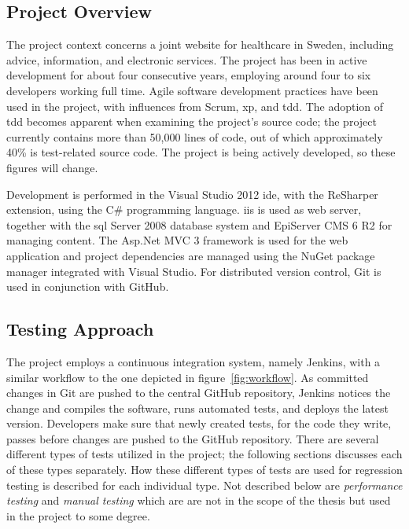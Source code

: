 \documentclass[a4paper,english,12pt]{report}
\begin{document}
\subsection{Project Overview}
The project context concerns a joint website for healthcare in Sweden, including advice, information, and electronic services. The project has been in active development for about four consecutive years, employing around four to six developers working full time. Agile software development practices have been used in the project, with influences from Scrum, \gls{xp}, and \gls{tdd}. The adoption of \gls{tdd} becomes apparent when examining the project's source code; the project currently contains more than 50,000 lines of code, out of which approximately 40\% is test-related source code. The project is being actively developed, so these figures will change.

Development is performed in the Visual Studio 2012 \gls{ide}, with the ReSharper extension, using the C\# programming language. \Gls{iis} is used as web server, together with the \gls{sql} Server 2008 database system and EpiServer CMS 6 R2 for managing content. The Asp.Net MVC 3 framework is used for the web application and project dependencies are managed using the NuGet package manager integrated with Visual Studio. For distributed version control, Git is used in conjunction with GitHub.

\subsection{Testing Approach}\label{sec:testing-approach}
The project employs a continuous integration system, namely Jenkins, with a similar workflow to the one depicted in figure~\vref{fig:workflow}. As committed changes in Git are pushed to the central GitHub repository, Jenkins notices the change and compiles the software, runs automated tests, and deploys the latest version. Developers make sure that newly created tests, for the code they write, passes before changes are pushed to the GitHub repository. There are several different types of tests utilized in the project; the following sections discusses each of these types separately. How these different types of tests are used for regression testing is described for each individual type. Not described below are \textit{performance testing} and \textit{manual testing} which are are not in the scope of the thesis but used in the project to some degree.
\end{document}
